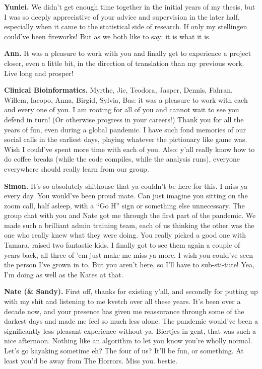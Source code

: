 \textbf{Yunlei.} We didn't get enough time together in the initial years of my thesis, but I was so deeply appreciative of your advice and supervision in the later half, especially when it came to the statistical side of research. If only my stellingen could've been fireworks! But as we both like to say: it is what it is.

\textbf{Ann.} It was a pleasure to work with you and finally get to experience a project closer, even a little bit, in the direction of translation than my previous work. Live long and prosper!

\textbf{Clinical Bioinformatics.} Myrthe, Jie, Teodora, Jasper, Dennis, Fahran, Willem, Iacopo, Anna, Birgid, Sylvia, Bas: it was a pleasure to work with each and every one of you. I am rooting for all of you and cannot wait to see you defend in turn! (Or otherwise progress in your careers!) Thank you for all the years of fun, even during a global pandemic. I have such fond memories of our social calls in the earliest days, playing whatever the pictionary like game was. Wish I could've spent more time with each of you. Also: y'all really know how to do coffee breaks (while the code compiles, while the analysis runs), everyone everywhere should really learn from our group.

\textbf{Simon.} It's so absolutely shithouse that ya couldn't be here for this. I miss ya every day. You would've been proud mate. Can just imagine you sitting on the zoom call, half asleep, with a ``Go H'' sign or something else unnecessary. The group chat with you and Nate got me through the first part of the pandemic. We made such a brilliant admin training team, each of us thinking the other was the one who really knew what they were doing. You really picked a good one with Tamara, raised two fantastic kids. I finally got to see them again a couple of years back, all three of 'em just make me miss ya more. I wish you could've seen the person I've grown in to. But you aren't here, so I'll have to sub-sti-tute! Yea, I'm doing as well as the Kates at that.

\textbf{Nate (\& Sandy).} First off, thanks for existing y'all, and secondly for putting up with my shit and listening to me kvetch over all these years. It's been over a decade now, and your presence has given me reassurance through some of the darkest days and made me feel so much less alone. The pandemic would've been a significantly less pleasant experience without ya. Biertjes in gent, that was such a nice afternoon. Nothing like an algorithm to let you know you're wholly normal. Let's go kayaking sometime eh? The four of us? It'll be fun, or something. At least you'd be away from The Horrors. {\fontRedacted Miss you.} {\fontRedacted bestie.}

